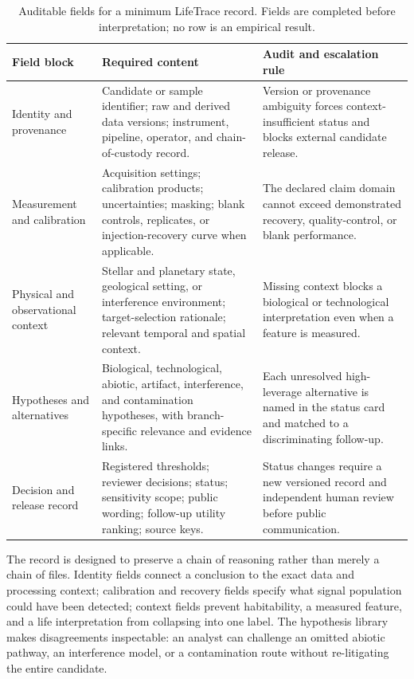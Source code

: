 \documentclass[conference]{IEEEtran}
\begin{document}
\begin{table}[t]
\caption{Auditable fields for a minimum LifeTrace record. Fields are completed before interpretation; no row is an empirical result.}
\label{tab:record-schema}
\centering
\footnotesize
\setlength{\tabcolsep}{3pt}
\begin{tabular}{p{} p{} p{}}
\hline
\textbf{Field block} & \textbf{Required content} & \textbf{Audit and escalation rule}\\
\hline
Identity and provenance & Candidate or sample identifier; raw and derived data versions; instrument, pipeline, operator, and chain-of-custody record. & Version or provenance ambiguity forces context-insufficient status and blocks external candidate release.\\
Measurement and calibration & Acquisition settings; calibration products; uncertainties; masking; blank controls, replicates, or injection-recovery curve when applicable. & The declared claim domain cannot exceed demonstrated recovery, quality-control, or blank performance.\\
Physical and observational context & Stellar and planetary state, geological setting, or interference environment; target-selection rationale; relevant temporal and spatial context. & Missing context blocks a biological or technological interpretation even when a feature is measured.\\
Hypotheses and alternatives & Biological, technological, abiotic, artifact, interference, and contamination hypotheses, with branch-specific relevance and evidence links. & Each unresolved high-leverage alternative is named in the status card and matched to a discriminating follow-up.\\
Decision and release record & Registered thresholds; reviewer decisions; status; sensitivity scope; public wording; follow-up utility ranking; source keys. & Status changes require a new versioned record and independent human review before public communication.\\
\hline
\end{tabular}
\end{table}

The record is designed to preserve a chain of reasoning rather than merely a chain of files. Identity fields connect a conclusion to the exact data and processing context; calibration and recovery fields specify what signal population could have been detected; context fields prevent habitability, a measured feature, and a life interpretation from collapsing into one label. The hypothesis library makes disagreements inspectable: an analyst can challenge an omitted abiotic pathway, an interference model, or a contamination route without re-litigating the entire candidate.
\end{document}
